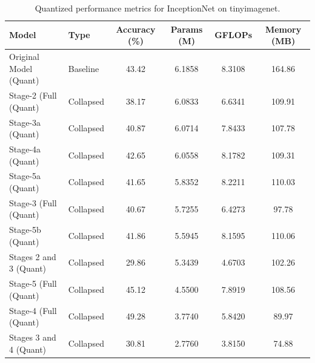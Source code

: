 \begin{table}
\caption{Quantized performance metrics for InceptionNet on tinyimagenet.}
\label{tab:InceptionNet_tinyimagenet_quant}
\begin{tabular}{llcccc}
\toprule
Model & Type & Accuracy (\%) & Params (M) & GFLOPs & Memory (MB) \\
\midrule
Original Model
(Quant) & Baseline & 43.42 & 6.1858 & 8.3108 & 164.86 \\
Stage-2 (Full
(Quant) & Collapsed & 38.17 & 6.0833 & 6.6341 & 109.91 \\
Stage-3a
(Quant) & Collapsed & 40.87 & 6.0714 & 7.8433 & 107.78 \\
Stage-4a
(Quant) & Collapsed & 42.65 & 6.0558 & 8.1782 & 109.31 \\
Stage-5a
(Quant) & Collapsed & 41.65 & 5.8352 & 8.2211 & 110.03 \\
Stage-3 (Full
(Quant) & Collapsed & 40.67 & 5.7255 & 6.4273 & 97.78 \\
Stage-5b
(Quant) & Collapsed & 41.86 & 5.5945 & 8.1595 & 110.06 \\
Stages 2 and 3
(Quant) & Collapsed & 29.86 & 5.3439 & 4.6703 & 102.26 \\
Stage-5 (Full
(Quant) & Collapsed & 45.12 & 4.5500 & 7.8919 & 108.56 \\
Stage-4 (Full
(Quant) & Collapsed & 49.28 & 3.7740 & 5.8420 & 89.97 \\
Stages 3 and 4
(Quant) & Collapsed & 30.81 & 2.7760 & 3.8150 & 74.88 \\
\bottomrule
\end{tabular}
\end{table}
